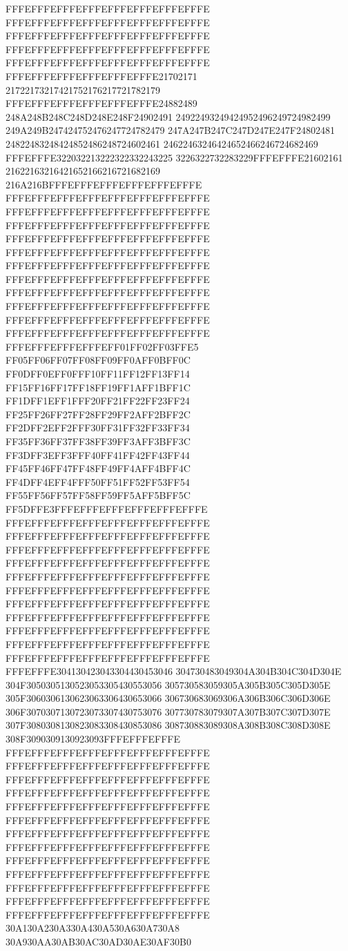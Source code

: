 FFFEFFFEFFFEFFFEFFFEFFFEFFFEFFFE
FFFEFFFEFFFEFFFEFFFEFFFEFFFEFFFE
FFFEFFFEFFFEFFFEFFFEFFFEFFFEFFFE
FFFEFFFEFFFEFFFEFFFEFFFEFFFEFFFE
FFFEFFFEFFFEFFFEFFFEFFFEFFFEFFFE
FFFEFFFEFFFEFFFEFFFEFFFE21702171
21722173217421752176217721782179
FFFEFFFEFFFEFFFEFFFEFFFE24882489
248A248B248C248D248E248F24902491
24922493249424952496249724982499
249A249B247424752476247724782479
247A247B247C247D247E247F24802481
24822483248424852486248724602461
24622463246424652466246724682469
FFFEFFFE322032213222322332243225
3226322732283229FFFEFFFE21602161
21622163216421652166216721682169
216A216BFFFEFFFEFFFEFFFEFFFEFFFE
FFFEFFFEFFFEFFFEFFFEFFFEFFFEFFFE
FFFEFFFEFFFEFFFEFFFEFFFEFFFEFFFE
FFFEFFFEFFFEFFFEFFFEFFFEFFFEFFFE
FFFEFFFEFFFEFFFEFFFEFFFEFFFEFFFE
FFFEFFFEFFFEFFFEFFFEFFFEFFFEFFFE
FFFEFFFEFFFEFFFEFFFEFFFEFFFEFFFE
FFFEFFFEFFFEFFFEFFFEFFFEFFFEFFFE
FFFEFFFEFFFEFFFEFFFEFFFEFFFEFFFE
FFFEFFFEFFFEFFFEFFFEFFFEFFFEFFFE
FFFEFFFEFFFEFFFEFFFEFFFEFFFEFFFE
FFFEFFFEFFFEFFFEFFFEFFFEFFFEFFFE
FFFEFFFEFFFEFFFEFF01FF02FF03FFE5
FF05FF06FF07FF08FF09FF0AFF0BFF0C
FF0DFF0EFF0FFF10FF11FF12FF13FF14
FF15FF16FF17FF18FF19FF1AFF1BFF1C
FF1DFF1EFF1FFF20FF21FF22FF23FF24
FF25FF26FF27FF28FF29FF2AFF2BFF2C
FF2DFF2EFF2FFF30FF31FF32FF33FF34
FF35FF36FF37FF38FF39FF3AFF3BFF3C
FF3DFF3EFF3FFF40FF41FF42FF43FF44
FF45FF46FF47FF48FF49FF4AFF4BFF4C
FF4DFF4EFF4FFF50FF51FF52FF53FF54
FF55FF56FF57FF58FF59FF5AFF5BFF5C
FF5DFFE3FFFEFFFEFFFEFFFEFFFEFFFE
FFFEFFFEFFFEFFFEFFFEFFFEFFFEFFFE
FFFEFFFEFFFEFFFEFFFEFFFEFFFEFFFE
FFFEFFFEFFFEFFFEFFFEFFFEFFFEFFFE
FFFEFFFEFFFEFFFEFFFEFFFEFFFEFFFE
FFFEFFFEFFFEFFFEFFFEFFFEFFFEFFFE
FFFEFFFEFFFEFFFEFFFEFFFEFFFEFFFE
FFFEFFFEFFFEFFFEFFFEFFFEFFFEFFFE
FFFEFFFEFFFEFFFEFFFEFFFEFFFEFFFE
FFFEFFFEFFFEFFFEFFFEFFFEFFFEFFFE
FFFEFFFEFFFEFFFEFFFEFFFEFFFEFFFE
FFFEFFFEFFFEFFFEFFFEFFFEFFFEFFFE
FFFEFFFE304130423043304430453046
304730483049304A304B304C304D304E
304F3050305130523053305430553056
305730583059305A305B305C305D305E
305F3060306130623063306430653066
306730683069306A306B306C306D306E
306F3070307130723073307430753076
307730783079307A307B307C307D307E
307F3080308130823083308430853086
308730883089308A308B308C308D308E
308F3090309130923093FFFEFFFEFFFE
FFFEFFFEFFFEFFFEFFFEFFFEFFFEFFFE
FFFEFFFEFFFEFFFEFFFEFFFEFFFEFFFE
FFFEFFFEFFFEFFFEFFFEFFFEFFFEFFFE
FFFEFFFEFFFEFFFEFFFEFFFEFFFEFFFE
FFFEFFFEFFFEFFFEFFFEFFFEFFFEFFFE
FFFEFFFEFFFEFFFEFFFEFFFEFFFEFFFE
FFFEFFFEFFFEFFFEFFFEFFFEFFFEFFFE
FFFEFFFEFFFEFFFEFFFEFFFEFFFEFFFE
FFFEFFFEFFFEFFFEFFFEFFFEFFFEFFFE
FFFEFFFEFFFEFFFEFFFEFFFEFFFEFFFE
FFFEFFFEFFFEFFFEFFFEFFFEFFFEFFFE
FFFEFFFEFFFEFFFEFFFEFFFEFFFEFFFE
FFFEFFFEFFFEFFFEFFFEFFFEFFFEFFFE
30A130A230A330A430A530A630A730A8
30A930AA30AB30AC30AD30AE30AF30B0
